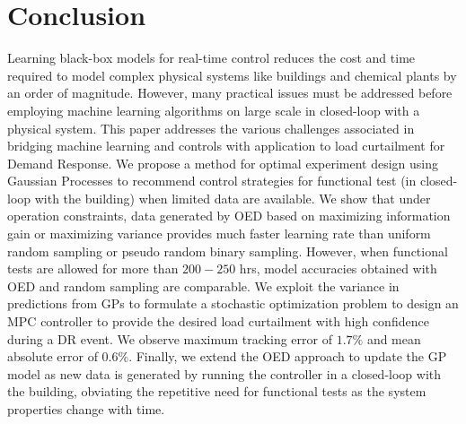\section{Conclusion}

Learning black-box models for real-time control reduces the cost and time required to model complex physical systems like buildings and chemical plants by an order of magnitude. 
However, many practical issues must be addressed before employing machine learning algorithms on large scale in closed-loop with a physical system.
This paper addresses the various challenges associated in bridging machine learning and controls with application to load curtailment for Demand Response.
We propose a method for optimal experiment design using Gaussian Processes to recommend control strategies for functional test (in closed-loop with the building) when limited data are available. 
We show that under operation constraints, data generated by OED based on maximizing information gain or maximizing variance provides much faster learning rate than uniform random sampling or pseudo random binary sampling. 
However, when functional tests are allowed for more than \(200-250\) hrs, model accuracies obtained with OED and random sampling are comparable.
We exploit the variance in predictions from GPs to formulate a stochastic optimization problem to design an MPC controller to provide the desired load curtailment with high confidence during a DR event. 
We observe maximum tracking error of \(1.7\%\) and mean absolute error of \(0.6\%\).
Finally, we extend the OED approach to update the GP model as new data is generated by running the controller in a closed-loop with the building, obviating the repetitive need for functional tests as the system properties change with time.
